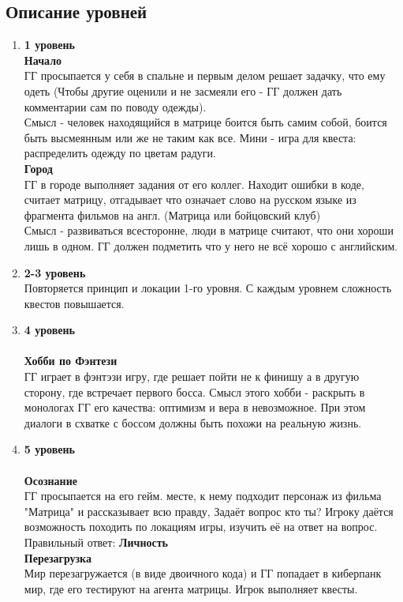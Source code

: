 \documentclass{article}
\begin{document}
\subsection{Описание уровней}
\begin{enumerate}[label=\arabic*., leftmargin=*]
    \item \textbf{1 уровень}\\
    \textbf{Начало}\\
    ГГ просыпается у себя в спальне и первым делом решает задачку, что ему одеть (Чтобы другие оценили и не засмеяли его - ГГ должен дать комментарии сам по поводу одежды).\\Смысл - человек находящийся в матрице боится быть самим собой, боится быть высмеянным или же не таким как все. Мини - игра для квеста: распределить одежду по цветам радуги.
\\ \textbf{Город}\\
ГГ в городе выполняет задания от его коллег. Находит ошибки в коде, считает матрицу, отгадывает что означает слово на русском языке из фрагмента фильмов на англ. (Матрица или бойцовский клуб)\\Смысл - развиваться всесторонне, люди в матрице считают, что они хороши лишь в одном. ГГ должен подметить что у него не всё хорошо с английским.
\item \textbf{2-3 уровень}\\
Повторяется принцип и локации 1-го уровня. С каждым уровнем сложность квестов повышается.
\item \textbf{4 уровень}\\
\\ \textbf{Хобби по Фэнтези}\\
 ГГ играет в фэнтэзи игру, где решает пойти не к финишу а в другую сторону, где встречает первого босса. Смысл этого хобби - раскрыть в монологах ГГ его качества: оптимизм и вера в невозможное. При этом диалоги в схватке с боссом должны быть похожи на реальную жизнь.
 \item \textbf{5 уровень}\\
 \\ \textbf{Осознание}\\
 ГГ просыпается на его гейм. месте, к нему подходит персонаж из фильма "Матрица" и рассказывает всю правду, Задаёт вопрос кто ты? Игроку даётся возможность походить по локациям игры, изучить её на ответ на вопрос. Правильный ответ: \textbf{Личность}
  \\ \textbf{Перезагрузка}\\
  Мир перезагружается (в виде двоичного кода) и ГГ попадает в киберпанк мир, где его тестируют на агента матрицы. Игрок выполняет квесты.

\end{enumerate}
\end{document}
